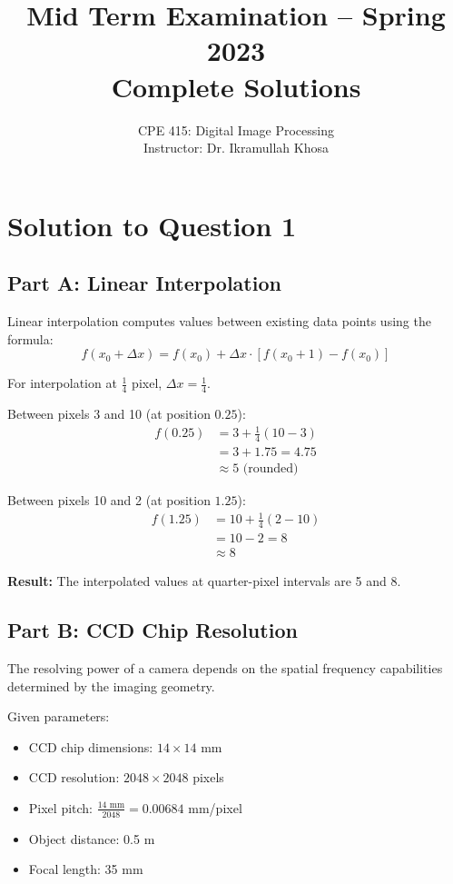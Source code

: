 \documentclass[12pt,a4paper]{article}
\title{\textbf{Mid Term Examination -- Spring 2023} \\ \textbf{Complete Solutions}}
\author{CPE 415: Digital Image Processing \\ Instructor: Dr. Ikramullah Khosa}
\date{}
\begin{document}
\maketitle

\section*{Solution to Question 1}

\subsection*{Part A: Linear Interpolation}

Linear interpolation computes values between existing data points using the formula:
\begin{equation*}
f(x_0 + \Delta x) = f(x_0) + \Delta x \cdot [f(x_0 + 1) - f(x_0)]
\end{equation*}

For interpolation at $\frac{1}{4}$ pixel, $\Delta x = \frac{1}{4}$.

Between pixels 3 and 10 (at position $0.25$):
\begin{align*}
f(0.25) &= 3 + \frac{1}{4}(10 - 3) \\
&= 3 + 1.75 = 4.75 \\
&\approx 5 \text{ (rounded)}
\end{align*}

Between pixels 10 and 2 (at position $1.25$):
\begin{align*}
f(1.25) &= 10 + \frac{1}{4}(2 - 10) \\
&= 10 - 2 = 8 \\
&\approx 8
\end{align*}

\textbf{Result:} The interpolated values at quarter-pixel intervals are 5 and 8.

\subsection*{Part B: CCD Chip Resolution}

The resolving power of a camera depends on the spatial frequency capabilities determined by the imaging geometry.

Given parameters:
\begin{itemize}
\item CCD chip dimensions: $14 \times 14$ mm
\item CCD resolution: $2048 \times 2048$ pixels
\item Pixel pitch: $\frac{14 \text{ mm}}{2048} = 0.00684$ mm/pixel
\item Object distance: 0.5 m
\item Focal length: 35 mm
\end{itemize}
\end{document}
